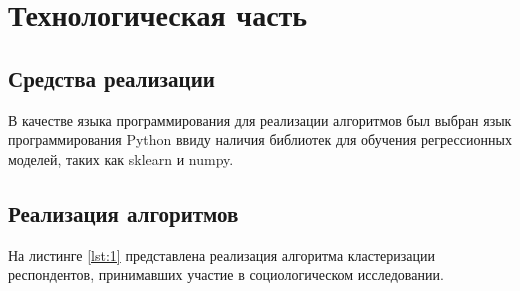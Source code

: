 \chapter{Технологическая часть}

\section{Средства реализации}

В качестве языка программирования для реализации алгоритмов был выбран язык программирования Python ввиду наличия библиотек для обучения регрессионных моделей, таких как sklearn и numpy.

\section{Реализация алгоритмов}

На листинге \ref{lst:1} представлена реализация алгоритма кластеризации респондентов, принимавших участие в социологическом исследовании.

